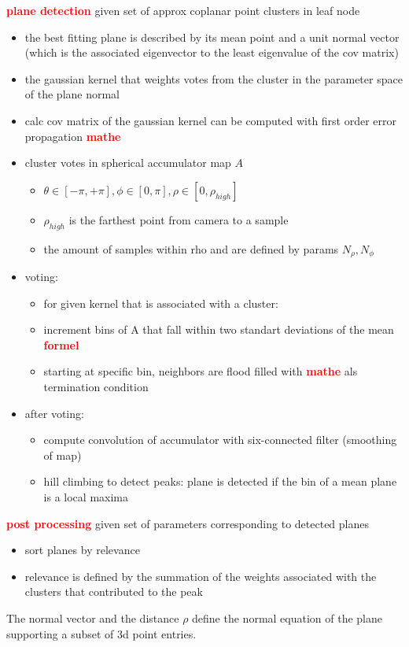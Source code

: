 \documentclass[main.tex]{subfiles}
\begin{document}
\textbf{\textcolor{red}{plane detection}}
given set of approx coplanar point clusters in leaf node
\begin{itemize}
    \item the best fitting plane is described by its mean point and a unit normal vector (which is the
          associated eigenvector to the least eigenvalue of the cov matrix)
    \item the gaussian kernel that weights votes from the cluster in the parameter space of the plane normal
    \item calc cov matrix of the gaussian kernel can be computed with first order error propagation \textbf{\textcolor{red}{mathe}}
    \item cluster votes in spherical accumulator map $A$
          \begin{itemize}
              \item $\theta \in [-\pi , +\pi], \phi \in [0, \pi], \rho \in [0, \rho_{high}]$
              \item $\rho_{high}$ is the farthest point from camera to a sample
              \item the amount of samples within rho and are defined by params $N_\rho, N_\phi$
          \end{itemize}
    \item voting:
          \begin{itemize}
              \item for given kernel that is associated with a cluster:
              \item increment bins of A that fall within two standart deviations of the mean \textbf{\textcolor{red}{formel}}
              \item starting at specific bin, neighbors are flood filled with \textbf{\textcolor{red}{mathe}} als termination condition
          \end{itemize}
    \item after voting:
          \begin{itemize}
              \item compute convolution of accumulator with six-connected filter (smoothing of map)
              \item hill climbing to detect peaks: plane is detected if the bin of a mean plane is a local maxima
          \end{itemize}
\end{itemize}

\textbf{\textcolor{red}{post processing}}
given set of parameters corresponding to detected planes
\begin{itemize}
    \item sort planes by relevance
    \item relevance is defined by the summation of the weights associated with the clusters that contributed to the peak
\end{itemize}
The normal vector and the distance $\rho$ define the normal equation of the plane supporting a subset of
3d point entries.
\end{document}
